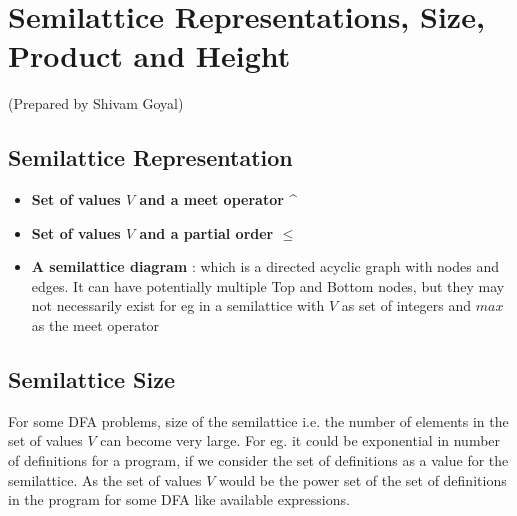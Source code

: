 \section {Semilattice Representations, Size, Product and Height}
\setlength{\parindent}{0pt}
(Prepared by Shivam Goyal)

\vspace{0.3cm}

\subsection{Semilattice Representation}
\begin{itemize}
    \item \textbf{Set of values $V$ and a meet operator \^{}}
    \item \textbf{Set of values $V$ and a partial order $\leq$}
    \item \textbf{A semilattice diagram} : which is a directed acyclic graph with nodes and edges. It can have potentially multiple Top and Bottom nodes, but they may not necessarily exist for eg in a semilattice with $V$ as set of integers and $max$ as the meet operator
\end{itemize}

\subsection{Semilattice Size}
For some DFA problems, size of the semilattice i.e. the number of elements in the set of values $V$ can become very large. For eg. it could be exponential in number of definitions for a program, if we consider the set of definitions as a value for the semilattice. As the set of values $V$ would be the power set of the set of definitions in the program for some DFA like available expressions.
